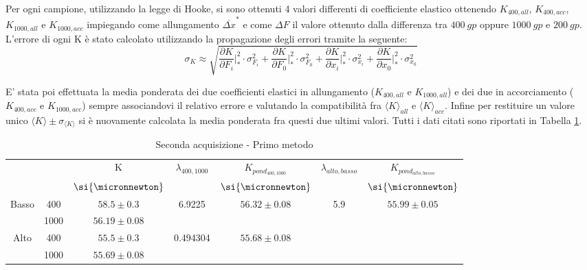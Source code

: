 \documentclass[a4paper,11pt,oneside]{article}
\begin{document}
Per ogni campione, utilizzando la legge di Hooke, si sono ottenuti 4 valori differenti di coefficiente elastico ottenendo $K_{400, all}$, $K_{400, acc}$, $K_{1000, all}$ e $K_{1000, acc}$ impiegando come  allungamento ${\overline{\Delta x}}^\ast$ e come $\Delta F$ il valore ottenuto dalla differenza tra $\SI{400}{gp}$ oppure $\SI{1000}{gp} $ e $ \SI{200}{gp}$. L'errore di ogni K è stato calcolato utilizzando la propagazione degli errori tramite la seguente:
\begin{equation*}
\sigma_K \approx \sqrt{ \frac{\partial K }{\partial F_i} \Big|_{\ast}^2 \cdot  \sigma_{ F_i}^2 +
\frac{\partial K }{\partial F_0} \Big|_{\ast}^2\cdot  \sigma_{ F_0}^2 +
 \frac{\partial K }{\partial x_i}\Big|_{\ast}^2 \cdot  \sigma_{x_i}^2 +
 \frac{\partial K }{\partial x_0}\Big|_{\ast}^2\cdot  \sigma_{x_0} ^2 }
\end{equation*}

E' stata poi effettuata la media ponderata dei due coefficienti elastici in allungamento ($K_{400, all}$ e $K_{1000, all}$) e dei due in accorciamento ($K_{400, acc}$ e $K_{1000, acc}$) sempre associandovi il relativo errore e valutando la compatibilità fra ${\langle K \rangle}_{all}$ e ${\langle K \rangle}_{acc}$. Infine per restituire un valore unico $\langle K \rangle \pm \sigma_{\langle K \rangle}$ si è nuovamente calcolata la media ponderata fra questi due ultimi valori. Tutti i dati citati sono riportati in Tabella \ref{tab:2ac_1metodo}.\\


\begin{table}[h!]
\centering
\caption{Seconda acquisizione - Primo metodo}
\label{tab:2ac_1metodo}

    \begin{tabular}{|c|c|c|c||c|c|c|}
        \hline
        \multicolumn{2}{|c|}{}  & K &  $\lambda_{400, 1000}$ & $K_{pond_{400, 1000}}$ & $\lambda_{alto, basso}$  & $K_{pond_{alto, basso}}$ \\
        \multicolumn{2}{|c|}{}  & $\si{\micronnewton}$ && $\si{\micronnewton}$ && $\si{\micronnewton}$ \\\hline
        \multirow{2}{*}{Basso} & {\cellcolor[rgb]{0.85,0.85,0.85}}400  & {\cellcolor[rgb]{0.85,0.85,0.85}}$58.5\pm0.3$  & \multirow{2}{*}{6.9225}   & \multirow{2}{*}{$56.32\pm0.08$} & \multirow{4}{*}{5.9} & \multirow{4}{*}{$55.99\pm0.05$} \\\cline{2-3}
        & 1000 & $56.19\pm0.08$ &  &  &  & \\\cline{1-5}
        \multirow{2}{*}{Alto}  & {\cellcolor[rgb]{0.85,0.85,0.85}}400  & {\cellcolor[rgb]{0.85,0.85,0.85}}$55.5\pm0.3$  & \multirow{2}{*}{0.494304} & \multirow{2}{*}{$55.68\pm0.08$} & & \\\cline{2-3}
        & 1000 & $55.69\pm0.08$ &  &  &  &\\ \hline 
    \end{tabular}
\end{table}
\end{document}
